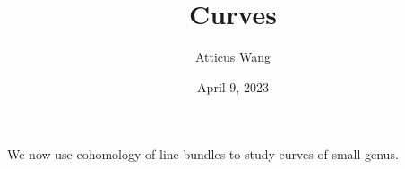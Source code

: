 \documentclass[11pt]{amsart}
\title{Curves}
\author{Atticus Wang}
\date{April 9, 2023}
\begin{document}
\maketitle

We now use cohomology of line bundles to study curves of small genus. 
\end{document}
